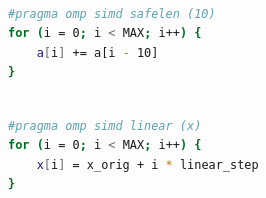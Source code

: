 \noindent\begin{minipage}{\linewidth}
\begin{lstlisting}[language=bash, caption={Safelen, maximální počet iterací, které se mohou vykonávat současně bez porušení závislostí.}]

#pragma omp simd safelen (10)
for (i = 0; i < MAX; i++) {
    a[i] += a[i - 10]
}

\end{lstlisting}
\end{minipage}

\noindent\begin{minipage}{\linewidth}
\begin{lstlisting}[language=bash, caption={Linear, hodnota proměnné je ve vztahu k číslu iterace.}]

#pragma omp simd linear (x)
for (i = 0; i < MAX; i++) {
    x[i] = x_orig + i * linear_step
}

\end{lstlisting}
\end{minipage}
